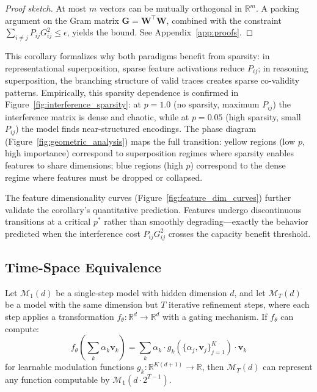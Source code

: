 \begin{proof}[Proof sketch]
At most $m$ vectors can be mutually orthogonal in $\mathbb{R}^m$. A packing argument on the Gram matrix $\mathbf{G} = \mathbf{W}^\top \mathbf{W}$, combined with the constraint $\sum_{i \neq j} P_{ij} G_{ij}^2 \leq \epsilon$, yields the bound. See Appendix~\ref{app:proofs}.
\end{proof}

This corollary formalizes why both paradigms benefit from sparsity: in representational superposition, sparse feature activations reduce $P_{ij}$; in reasoning superposition, the branching structure of valid traces creates sparse co-validity patterns. Empirically, this sparsity dependence is confirmed in Figure~\ref{fig:interference_sparsity}: at $p=1.0$ (no sparsity, maximum $P_{ij}$) the interference matrix is dense and chaotic, while at $p=0.05$ (high sparsity, small $P_{ij}$) the model finds near-structured encodings. The phase diagram (Figure~\ref{fig:geometric_analysis}) maps the full transition: yellow regions (low $p$, high importance) correspond to superposition regimes where sparsity enables features to share dimensions; blue regions (high $p$) correspond to the dense regime where features must be dropped or collapsed.

The feature dimensionality curves (Figure~\ref{fig:feature_dim_curves}) further validate the corollary's quantitative prediction. Features undergo discontinuous transitions at a critical $p^*$ rather than smoothly degrading---exactly the behavior predicted when the interference cost $P_{ij} G_{ij}^2$ crosses the capacity benefit threshold.

\subsection{Time-Space Equivalence}

\begin{theorem}
\label{thm:timespace}
Let $\mathcal{M}_1(d)$ be a single-step model with hidden dimension $d$, and let $\mathcal{M}_T(d)$ be a model with the same dimension but $T$ iterative refinement steps, where each step applies a transformation $f_\theta: \mathbb{R}^d \to \mathbb{R}^d$ with a gating mechanism. If $f_\theta$ can compute:
\begin{equation}
f_\theta\left(\sum_k \alpha_k \mathbf{v}_k\right) = \sum_k \alpha_k \cdot g_k(\{\alpha_j, \mathbf{v}_j\}_{j=1}^K) \cdot \mathbf{v}_k
\end{equation}
for learnable modulation functions $g_k: \mathbb{R}^{K(d+1)} \to \mathbb{R}$, then $\mathcal{M}_T(d)$ can represent any function computable by $\mathcal{M}_1(d \cdot 2^{T-1})$.
\end{theorem}

